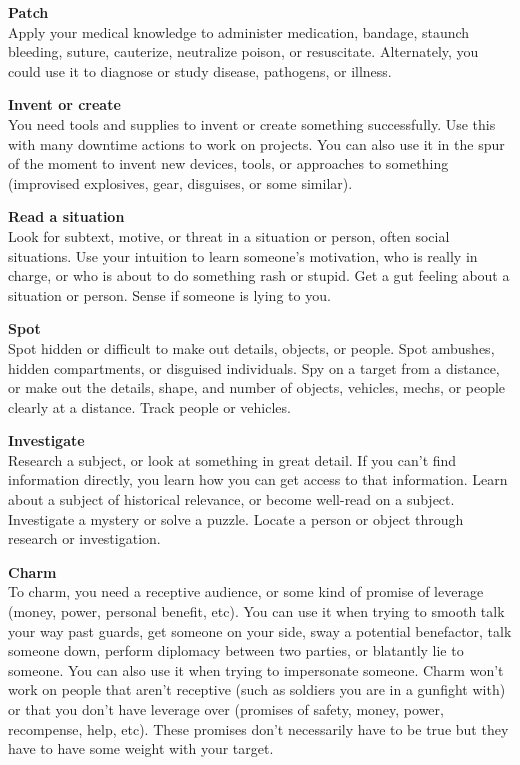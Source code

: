 \textbf{Patch}\\
Apply your medical knowledge to administer medication, bandage, staunch bleeding, suture, cauterize, neutralize poison, or resuscitate. Alternately, you could use it to diagnose or study disease, pathogens, or illness.

\textbf{Invent or create}\\
You need tools and supplies to invent or create something successfully. Use this with many downtime actions to work on projects. You can also use it in the spur of the moment to invent new devices, tools, or approaches to something (improvised explosives, gear, disguises, or some similar).

\textbf{Read a situation}\\ 
Look for subtext, motive, or threat in a situation or person, often social situations. Use your intuition to learn someone’s motivation, who is really in charge, or who is about to do something rash or stupid. Get a gut feeling about a situation or person. Sense if someone is lying to you.

\textbf{Spot}\\
Spot hidden or difficult to make out details, objects, or people. Spot ambushes, hidden compartments, or disguised individuals. Spy on a target from a distance, or make out the details, shape, and number of objects, vehicles, mechs, or people clearly at a distance. Track people or vehicles.

\textbf{Investigate}\\
Research a subject, or look at something in great detail. If you can’t find information directly, you learn how you can get access to that information. Learn about a subject of historical relevance, or become well-read on a subject. Investigate a mystery or solve a puzzle. Locate a person or object through research or investigation.

\textbf{Charm}\\
To charm, you need a receptive audience, or some kind of promise of leverage (money, power, personal benefit, etc). You can use it when trying to smooth talk your way past guards, get someone on your side, sway a potential benefactor, talk someone down, perform diplomacy between two parties, or blatantly lie to someone. You can also use it when trying to impersonate someone. Charm won’t work on people that aren’t receptive (such as soldiers you are in a gunfight with) or that you don’t have leverage over (promises of safety, money, power, recompense, help, etc). These promises don’t necessarily have to be true but they have to have some weight with your target.

